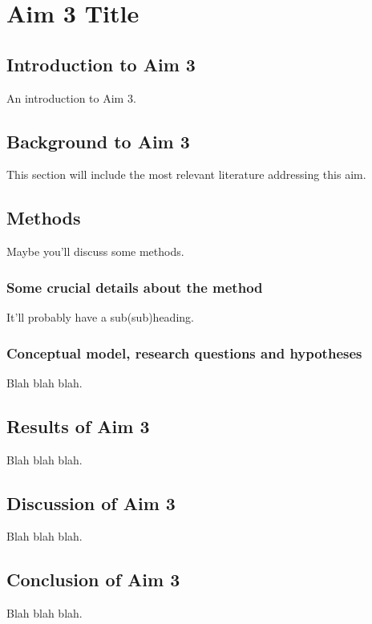 \center

\section{Aim 3 Title}

\raggedright

\subsection{Introduction to Aim 3}
An introduction to Aim 3.

\subsection{Background to Aim 3}
This section will include the most relevant literature addressing this
aim. 

\subsection{Methods}
Maybe you'll discuss some methods.

\subsubsection{Some crucial details about the method}
It'll probably have a sub(sub)heading.

\subsubsection{Conceptual model, research questions and hypotheses}
Blah blah blah.

\subsection{Results of Aim 3}
Blah blah blah.

\subsection{Discussion of Aim 3}
Blah blah blah.

\subsection{Conclusion of Aim 3}
Blah blah blah.